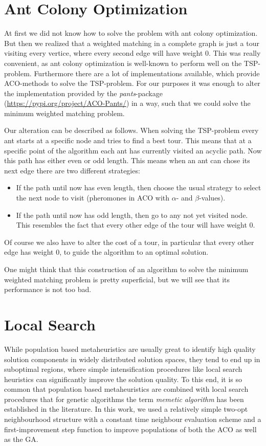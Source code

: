 \documentclass[12pt]{article}
\begin{document}
\section{Ant Colony Optimization}
At first we did not know how to solve the problem with ant colony optimization.
But then we realized that a weighted matching in a complete graph is just a tour visiting every vertice, where every second edge will have weight 0.
This was really convenient, as ant colony optimization is well-known to perform well on the TSP-problem.
Furthermore there are a lot of implementations available, which provide ACO-methods to solve the TSP-problem.
For our purposes it was enough to alter the implementation provided by the \textit{pants}-package (\url{https://pypi.org/project/ACO-Pants/}) in a way, such that we could solve the minimum weighted matching problem.

Our alteration can be described as follows.
When solving the TSP-problem every ant starts at a specific node and tries to find a best tour.
This means that at a specific point of the algorithm each ant has currently visited an acyclic path.
Now this path has either even or odd length.
This means when an ant can chose its next edge there are two different strategies:
\begin{itemize}
    \item If the path until now has even length, then choose the usual strategy to select the next node to visit (pheromones in ACO with $\alpha$- and $\beta$-values).
    \item If the path until now has odd length, then go to any not yet visited node.
    This resembles the fact that every other edge of the tour will have weight 0.
\end{itemize}
Of course we also have to alter the cost of a tour, in particular that every other edge has weight 0, to guide the algorithm to an optimal solution.

One might think that this construction of an algorithm to solve the minimum weighted matching problem is pretty superficial, but we will see that its performance is not too bad.

\section{Local Search}
While population based metaheuristics are usually great to identify high quality solution components in widely distributed solution spaces, they tend to end up in suboptimal regions, where simple intensification procedures like local search heuristics can significantly improve the solution quality. To this end, it is so common that population based metaheuristics are combined with local search procedures that for genetic algorithms the term \emph{memetic algorithm} has been established in the literature. In this work, we used a relatively simple two-opt neighbourhood structure with a constant time neighbour evaluation scheme and a first-improvement step function to improve populations of both the ACO as well as the GA. 
\end{document}
